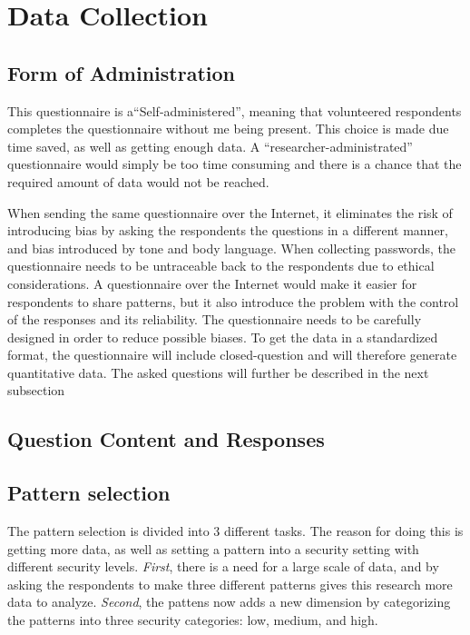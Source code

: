 \section{Data Collection} \label{sec:datacollection}


  \subsection{Form of Administration} \label{sec:formodadministration}

  This questionnaire is a``Self-administered'', meaning that volunteered respondents completes the questionnaire without me being present. This choice is made due time saved, as well as getting enough data. A ``researcher-administrated'' questionnaire would simply be too time consuming and there is a chance that the required amount of data would not be reached. 
    
  When sending the same questionnaire over the Internet, it eliminates the risk of introducing bias by asking the respondents the questions in a different manner, and bias introduced by tone and body language. When collecting passwords, the questionnaire needs to be untraceable back to the respondents due to ethical considerations. A questionnaire over the Internet would make it easier for respondents to share patterns, but it also introduce the problem with the control of the responses and its reliability. The questionnaire needs to be carefully designed in order to reduce possible biases. To get the data in a standardized format, the questionnaire will include closed-question and will therefore generate quantitative data. The asked questions will further be described in the next subsection

  \subsection{Question Content and Responses}\label{sec:questions}

    \subsection*{Pattern selection}
    The pattern selection is divided into 3 different tasks. The reason for doing this is getting more data, as well as setting a pattern into a security setting with different security levels. {\it First}, there is a need for a large scale of data, and by asking the respondents to make three different patterns gives this research more data to analyze. {\it Second}, the pattens now adds a new dimension by categorizing the patterns into three security categories: low, medium, and high. 

